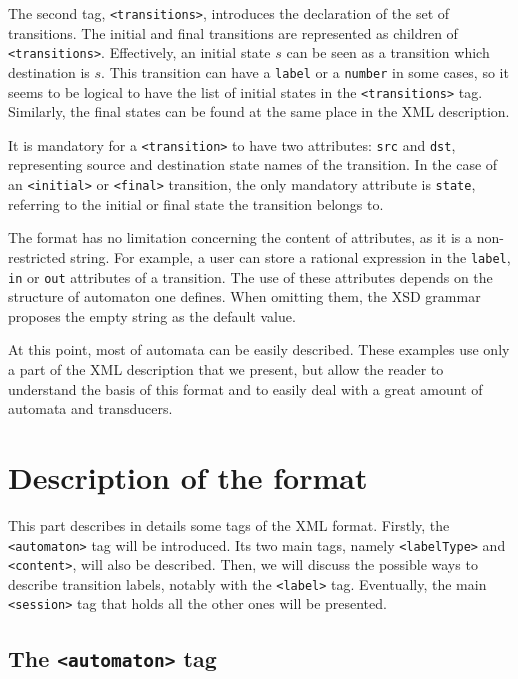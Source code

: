 \documentclass[a4paper]{article}
\newcommand{\xtag}[1]{\texttt{<#1>}}
\newcommand{\xattr}[1]{\texttt{#1}}
\begin{document}
The second tag, \xtag{transitions}, introduces the declaration
of the set of transitions. The initial and final
transitions are represented as children of
\xtag{transitions}. Effectively, an initial state $s$ can be seen as a transition
which destination is $s$. This transition can have a \xattr{label} or a
\xattr{number} in some cases, so it seems to be logical to have the list of
initial states in the \xtag{transitions} tag.  Similarly, the final
states can be found at the same place in the XML description.

It is mandatory for a \xtag{transition} to have two attributes:
\xattr{src} and \xattr{dst}, representing source and destination state
names of the
transition. In the case of an \xtag{initial} or \xtag{final} transition,
the only mandatory attribute is \xattr{state}, referring to the initial
or final state the transition belongs to.

The format has no limitation concerning the content of attributes, as
it is a non-restricted string. For example, a user can store a
rational expression in the \xattr{label}, \xattr{in} or \xattr{out}
attributes of a transition. The use of these attributes depends on the
structure of automaton one defines. When omitting them, the XSD
grammar proposes the empty string as the default value.

At this point, most of automata can be easily described. These
examples use only a part of the XML description that we present, but
allow the reader to understand the basis of this format and to easily
deal with a great amount of automata and transducers.

\section{Description of the format}

This part describes in details some tags of the XML format.  Firstly,
the \xtag{automaton} tag will be introduced.
Its two main tags, namely \xtag{labelType} and \xtag{content}, will also be
described. Then, we will discuss the possible ways to describe transition
labels, notably with the \xtag{label} tag. Eventually, the main \xtag{session}
tag that holds all the other ones will be presented.

\subsection{The \xtag{automaton} tag}
\end{document}

